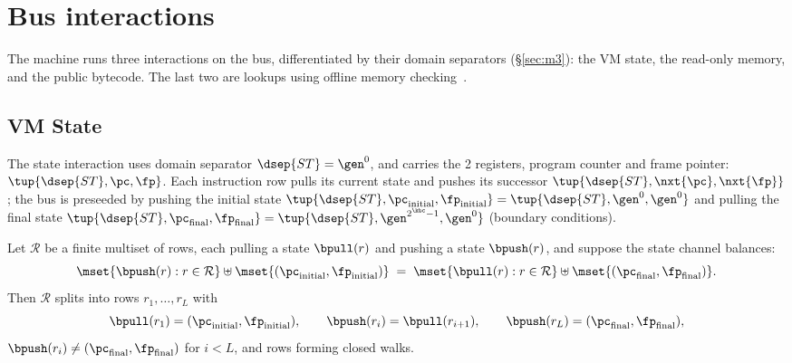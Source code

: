 \section{Bus interactions}\label{sec:omc}

The machine runs three interactions on the bus, differentiated by their domain separators (\S\ref{sec:m3}): the VM state, the read-only memory, and the public bytecode. The last two are lookups using offline memory checking~\cite{BEGKN94}.

\subsection{VM State}\label{sec:state}

The state interaction uses domain separator $\dsep{ST} = \gen^{0}$, and carries the 2 registers, program counter and frame pointer: $\tup{\dsep{ST},\pc,\fp}$. Each instruction row pulls its current state and pushes its successor $\tup{\dsep{ST},\nxt{\pc},\nxt{\fp}}$; the bus is preseeded by pushing the initial state $\tup{\dsep{ST},\pc_{\mathrm{initial}},\fp_{\mathrm{initial}}} = \tup{\dsep{ST},\gen^0,\gen^0}$ and pulling the final state $\tup{\dsep{ST},\pc_{\mathrm{final}},\fp_{\mathrm{final}}} = \tup{\dsep{ST},\gen^{2^{\kbc}-1},\gen^0}$ (boundary conditions).
\begin{proposition}\label{prop:walk}
Let $\mathcal R$ be a finite multiset of rows, each pulling a state $\bpull(r)$ and pushing a state $\bpush(r)$, and suppose the state channel balances:
\[
  \mset{\bpush(r):r\in\mathcal R}\uplus\mset{(\pc_{\mathrm{initial}},\fp_{\mathrm{initial}})}
  \;=\;\mset{\bpull(r):r\in\mathcal R}\uplus\mset{(\pc_{\mathrm{final}},\fp_{\mathrm{final}})} .
\]
Then $\mathcal R$ splits into rows $r_1,\dots,r_L$ with
\[
  \bpull(r_1)=(\pc_{\mathrm{initial}},\fp_{\mathrm{initial}}),\qquad \bpush(r_i)=\bpull(r_{i+1}),\qquad \bpush(r_L)=(\pc_{\mathrm{final}},\fp_{\mathrm{final}}),
\]
$\bpush(r_i)\neq(\pc_{\mathrm{final}},\fp_{\mathrm{final}})$ for $i<L$, and rows forming closed walks.
\end{proposition}

